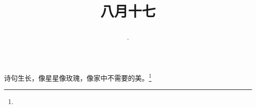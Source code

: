 \title{\date[d=19,m=9,y=2024][year:cn-y,年,month:cn,day:cn,日,·,weekday]·八月十七 }
诗句生长，像星星像玫瑰，像家中不需要的美。\footnote{ }

